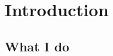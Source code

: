 \documentclass[]{article}
\title{}
\author{Ash}
\begin{document}
	
	\maketitle
	
	\begin{abstract}
		
	\end{abstract}
	
	\section{Introduction}
	
	\subsection{What I do}
	
	
\end{document}
